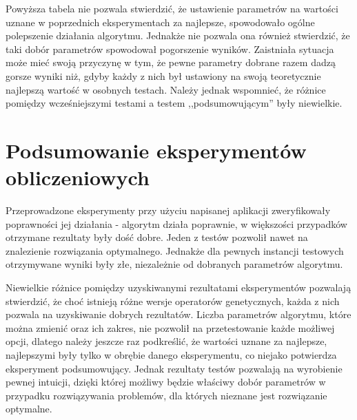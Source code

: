 Powyższa tabela nie pozwala stwierdzić, że ustawienie parametrów na wartości uznane w poprzednich eksperymentach za najlepsze, spowodowało ogólne polepszenie działania algorytmu. Jednakże nie pozwala ona również stwierdzić, że taki dobór parametrów spowodował pogorszenie wyników. Zaistniała sytuacja może mieć swoją przyczynę w tym, że pewne parametry dobrane razem dadzą gorsze wyniki niż, gdyby każdy z nich był ustawiony na swoją teoretycznie najlepszą wartość w osobnych testach. Należy jednak wspomnieć, że różnice pomiędzy wcześniejszymi testami a testem ,,podsumowującym'' były niewielkie.

\section{Podsumowanie eksperymentów obliczeniowych}
Przeprowadzone eksperymenty przy użyciu napisanej aplikacji zweryfikowały poprawności jej działania - algorytm działa poprawnie, w większości przypadków otrzymane rezultaty były dość dobre. Jeden z testów pozwolił nawet na znalezienie rozwiązania optymalnego. Jednakże dla pewnych instancji testowych otrzymywane wyniki były złe, niezależnie od dobranych parametrów algorytmu. 

Niewielkie różnice pomiędzy uzyskiwanymi rezultatami eksperymentów pozwalają stwierdzić, że choć istnieją różne wersje operatorów genetycznych, każda z nich pozwala na uzyskiwanie dobrych rezultatów. Liczba parametrów algorytmu, które można zmienić oraz ich zakres, nie pozwolił na przetestowanie każde możliwej opcji, dlatego należy jeszcze raz podkreślić, że wartości uznane za najlepsze, najlepszymi były tylko w obrębie danego eksperymentu, co niejako potwierdza eksperyment podsumowujący. Jednak rezultaty testów pozwalają na wyrobienie pewnej intuicji, dzięki której możliwy będzie właściwy dobór parametrów w przypadku rozwiązywania problemów, dla których nieznane jest rozwiązanie optymalne.  